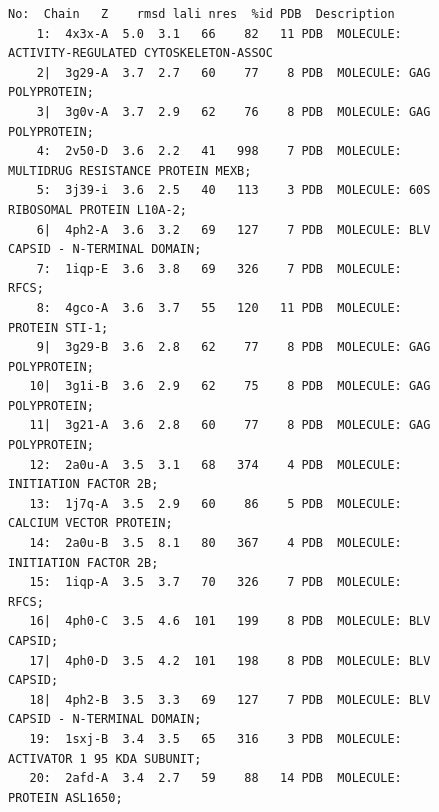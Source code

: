 \documentclass[preprint,12pt]{elsarticle}
\begin{document}
\begin{figure}
\centering
\begin{tiny}
\begin{Verbatim}[frame=single]
   No:  Chain   Z    rmsd lali nres  %id PDB  Description
    1:  4x3x-A  5.0  3.1   66    82   11 PDB  MOLECULE: ACTIVITY-REGULATED CYTOSKELETON-ASSOC
    2|  3g29-A  3.7  2.7   60    77    8 PDB  MOLECULE: GAG POLYPROTEIN;                                           
    3|  3g0v-A  3.7  2.9   62    76    8 PDB  MOLECULE: GAG POLYPROTEIN;                                           
    4:  2v50-D  3.6  2.2   41   998    7 PDB  MOLECULE: MULTIDRUG RESISTANCE PROTEIN MEXB;                         
    5:  3j39-i  3.6  2.5   40   113    3 PDB  MOLECULE: 60S RIBOSOMAL PROTEIN L10A-2;                              
    6|  4ph2-A  3.6  3.2   69   127    7 PDB  MOLECULE: BLV CAPSID - N-TERMINAL DOMAIN;                            
    7:  1iqp-E  3.6  3.8   69   326    7 PDB  MOLECULE: RFCS;                                                      
    8:  4gco-A  3.6  3.7   55   120   11 PDB  MOLECULE: PROTEIN STI-1;                                             
    9|  3g29-B  3.6  2.8   62    77    8 PDB  MOLECULE: GAG POLYPROTEIN;                                           
   10|  3g1i-B  3.6  2.9   62    75    8 PDB  MOLECULE: GAG POLYPROTEIN;                                           
   11|  3g21-A  3.6  2.8   60    77    8 PDB  MOLECULE: GAG POLYPROTEIN;                                           
   12:  2a0u-A  3.5  3.1   68   374    4 PDB  MOLECULE: INITIATION FACTOR 2B;                                      
   13:  1j7q-A  3.5  2.9   60    86    5 PDB  MOLECULE: CALCIUM VECTOR PROTEIN;                                    
   14:  2a0u-B  3.5  8.1   80   367    4 PDB  MOLECULE: INITIATION FACTOR 2B;                                      
   15:  1iqp-A  3.5  3.7   70   326    7 PDB  MOLECULE: RFCS;                                                      
   16|  4ph0-C  3.5  4.6  101   199    8 PDB  MOLECULE: BLV CAPSID;                                                
   17|  4ph0-D  3.5  4.2  101   198    8 PDB  MOLECULE: BLV CAPSID;                                                
   18|  4ph2-B  3.5  3.3   69   127    7 PDB  MOLECULE: BLV CAPSID - N-TERMINAL DOMAIN;                            
   19:  1sxj-B  3.4  3.5   65   316    3 PDB  MOLECULE: ACTIVATOR 1 95 KDA SUBUNIT;                                
   20:  2afd-A  3.4  2.7   59    88   14 PDB  MOLECULE: PROTEIN ASL1650;                                           
\end{Verbatim}

\end{tiny}
\end{figure}
\end{document}
